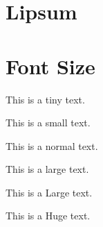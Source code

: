 \documentclass{article}
\begin{document}
    \section{Lipsum}
    \kant[2-3]

    \section{Font Size}
    \begin{tiny}
        This is a tiny text.\\
    \end{tiny}

    \begin{small}
        This is a small text.\\
    \end{small}

    This is a normal text.\\
    
    \begin{large}
        This is a large text.\\
    \end{large}

    \begin{Large}
        This is a Large text.\\
    \end{Large}
    
    \begin{Huge}
        This is a Huge text.\\
    \end{Huge}
    
\end{document}
